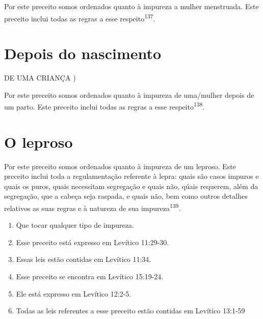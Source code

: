 \begin{itemize}
\begin{enumrate}
\begin{itemize}
\begin{itemize}
Por este preceito somos ordenados quanto à impureza a mulher menstruada.
Este preceito inclui todas as regras a esse
respeito\textsuperscript{137}.

\section{Depois do nascimento}


DE UMA CRIANÇA )


Por este preceito somos ordenados quanto à impureza de uma/mu­lher
depois de um parto. Este preceito inclui todas as regras a esse
respeito\textsuperscript{138}.

\section{O leproso}

Por este preceito somos ordenados quanto à impureza de um lepro­so. Este
preceito inclui toda a regulamentação referente à lepra: quais são casos
impuros e quais os puros, quais necessitam segregação e quais não, qúais
requerem, além da segregação, que a cabeça seja raspada, e quais não,
bem co­mo outros detalhes relativos as suas regras e à natureza de sua
impureza\textsuperscript{139}.

\begin{enumerate}
\def\labelenumi{\arabic{enumi}.}
\setcounter{enumi}{133}
\item
 
 Que tocar qualquer tipo de impureza.
 
\item
 
 Esse preceito está expresso em Levítico 11:29-30.
 
\item
 
 Essas leis estão contidas em Levítico 11:34.
 
\item
 
 Esse preceito se encontra em Levítico 15:19-24.
 
\item
 
 Ele está expresso em Levítico 12:2-5.
 
\item
 
 Todas as leis referentes a esse preceito estão contidas em Levítico
 13:1-59
 
\end{enumerate}





\end{itemize}
\end{itemize}
\end{enumrate}
\end{itemize}
